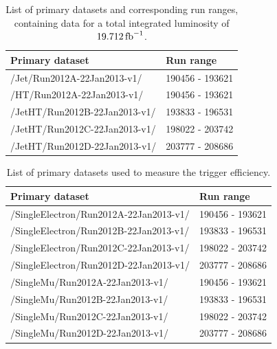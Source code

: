 \begin{table}[htdp]
\caption{List of primary datasets and corresponding run ranges, containing data for a total
integrated luminosity of $19.712\mbox{\ensuremath{\,\text{fb}^\text{$-$1}}}$.}
\begin{center}
\begin{tabular}{ l l }
\toprule
Primary dataset & Run range \\
\midrule
/Jet/Run2012A-22Jan2013-v1/ & 190456 - 193621 \\
/HT/Run2012A-22Jan2013-v1/  & 190456 - 193621 \\
/JetHT/Run2012B-22Jan2013-v1/ & 193833 - 196531 \\
/JetHT/Run2012C-22Jan2013-v1/ & 198022 - 203742 \\
/JetHT/Run2012D-22Jan2013-v1/ & 203777 - 208686  \\
\bottomrule
\end{tabular}
\end{center}
\label{tab:boost_primary_datasets}
\end{table}

\begin{table}[htdp]
\caption{List of primary datasets used to measure the trigger efficiency. }
\begin{center}
\begin{tabular}{ l l }
\toprule
Primary dataset & Run range \\
\midrule
/SingleElectron/Run2012A-22Jan2013-v1/ & 190456 - 193621 \\ 
/SingleElectron/Run2012B-22Jan2013-v1/ & 193833 - 196531 \\
/SingleElectron/Run2012C-22Jan2013-v1/ & 198022 - 203742 \\
/SingleElectron/Run2012D-22Jan2013-v1/ & 203777 - 208686  \\
\midrule
/SingleMu/Run2012A-22Jan2013-v1/ & 190456 - 193621 \\ 
/SingleMu/Run2012B-22Jan2013-v1/ & 193833 - 196531 \\
/SingleMu/Run2012C-22Jan2013-v1/ & 198022 - 203742 \\
/SingleMu/Run2012D-22Jan2013-v1/ & 203777 - 208686 \\
\bottomrule
\end{tabular}
\end{center}
\label{tab:boost_primary_datasets_trigeff}
\end{table}

